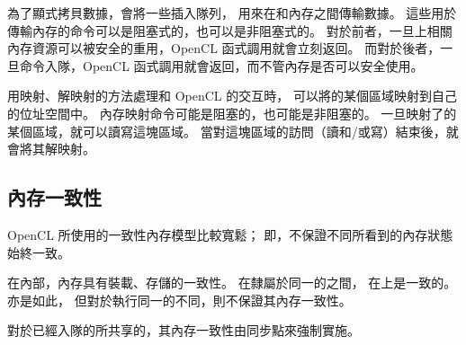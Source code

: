 為了顯式拷貝數據，會將一些插入隊列，
用來在和內存之間傳輸數據。
這些用於傳輸內存的命令可以是阻塞式的，也可以是非阻塞式的。
對於前者，一旦上相關內存資源可以被安全的重用，OpenCL 函式調用就會立刻返回。
而對於後者，一旦命令入隊，OpenCL 函式調用就會返回，而不管內存是否可以安全使用。

用映射、解映射的方法處理和 OpenCL 的交互時，
可以將的某個區域映射到自己的位址空間中。
內存映射命令可能是阻塞的，也可能是非阻塞的。
一旦映射了的某個區域，就可以讀寫這塊區域。
當對這塊區域的訪問（讀和/或寫）結束後，就會將其解映射。

\subsection{內存一致性}
OpenCL 所使用的一致性內存模型比較寬鬆；
即，不保證不同所看到的內存狀態始終一致。

在內部，內存具有裝載、存儲的一致性。
在隸屬於同一的之間，
在上是一致的。
亦是如此，
但對於執行同一的不同，則不保證其內存一致性。

對於已經入隊的所共享的，其內存一致性由同步點來強制實施。

